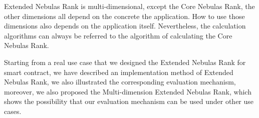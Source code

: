 Extended Nebulas Rank is multi-dimensional, except the Core Nebulas Rank, the other dimensions all depend on the concrete the application. How to use those dimensions also depends on the application itself. Nevertheless, the calculation algorithms can always be referred to the algorithm of calculating the Core Nebulas Rank.

\vspace{2em}

Starting from a real use case that we designed the Extended Nebulas Rank for smart contract, we have described an implementation method of Extended Nebulas Rank, we also illustrated the corresponding evaluation mechanism, moreover, we also proposed the Multi-dimension Extended Nebulas Rank, which shows the possibility that our evaluation mechanism can be used under other use cases.
